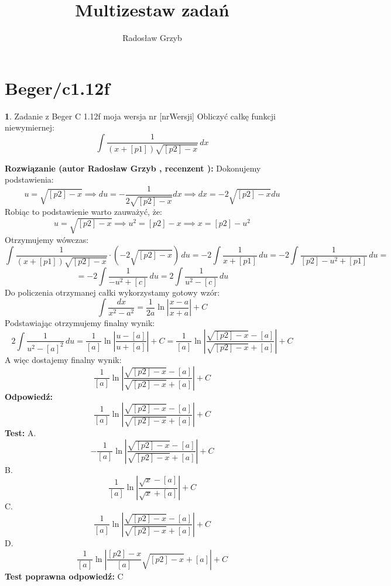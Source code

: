 \documentclass[12pt, a4paper]{article}
\title{Multizestaw zadań}
\author{Radosław Grzyb}
\date{}
\theoremstyle{definition} %
\newtheorem{zad}{}
\newcommand{\kategoria}[1]{\section{#1}} %
\newcommand{\zadStart}[1]{\begin{zad}#1\newline} %
\newcommand{\zadStop}{\end{zad}}   %
\newcommand{\rozwStart}[2]{\noindent \textbf{Rozwiązanie (autor #1 , recenzent #2): }\newline} %
\newcommand{\rozwStop}{\newline}                                            %
\newcommand{\odpStart}{\noindent \textbf{Odpowiedź:}\newline}    %
\newcommand{\odpStop}{\newline}                                             %
\newcommand{\testStart}{\noindent \textbf{Test:}\newline} %
\newcommand{\testStop}{\newline} %
\newcommand{\kluczStart}{\noindent \textbf{Test poprawna odpowiedź:}\newline} %
\newcommand{\kluczStop}{\newline} %
\begin{document}
\maketitle
\kategoria{Beger/c1.12f}
\zadStart{Zadanie z Beger C 1.12f moja wersja nr [nrWersji]}
Obliczyć całkę funkcji niewymiernej:
$$\int \frac{1}{(x+[p1])\sqrt{[p2]-x}}\,dx$$
\zadStop
\rozwStart{Radosław Grzyb}{}
Dokonujemy podstawienia:
$$u=\sqrt{[p2]-x}\implies du=-\frac{1}{2\sqrt{[p2]-x}}dx\implies dx=-2\sqrt{[p2]-x}du$$
Robiąc to podstawienie warto zauważyć, że:
$$u=\sqrt{[p2]-x}\implies u^2=[p2]-x \implies x=[p2]-u^2$$
Otrzymujemy wówczas:
$$\int \frac{1}{(x+[p1])\sqrt{[p2]-x}}\cdot(-2\sqrt{[p2]-x})\,du=-2\int \frac{1}{x+[p1]}\,du=-2\int \frac{1}{[p2]-u^2+[p1]}\,du=$$
$$=-2\int \frac{1}{-u^2+[c]}\,du=2\int \frac{1}{u^2-[c]}\,du$$
Do policzenia otrzymanej całki wykorzystamy gotowy wzór: $$\int\frac{dx}{x^2-a^2}=\frac{1}{2a}\ln\left|\frac{x-a}{x+a}\right|+C$$
Podstawiając otrzymujemy finalny wynik:
$$2\int \frac{1}{u^2-[a]^2}\,du=\frac{1}{[a]}\ln\left|\frac{u-[a]}{u+[a]}\right|+C=\frac{1}{[a]}\ln\left|\frac{\sqrt{[p2]-x}-[a]}{\sqrt{[p2]-x}+[a]}\right|+C$$
A więc dostajemy finalny wynik:
$$\frac{1}{[a]}\ln\left|\frac{\sqrt{[p2]-x}-[a]}{\sqrt{[p2]-x}+[a]}\right|+C$$
\rozwStop
\odpStart
$$\frac{1}{[a]}\ln\left|\frac{\sqrt{[p2]-x}-[a]}{\sqrt{[p2]-x}+[a]}\right|+C$$
\odpStop
\testStart
A.$$-\frac{1}{[a]}\ln\left|\frac{\sqrt{[p2]-x}-[a]}{\sqrt{[p2]-x}+[a]}\right|+C$$
B.$$\frac{1}{[a]}\ln\left|\frac{\sqrt{x}-[a]}{\sqrt{x}+[a]}\right|+C$$
C.$$\frac{1}{[a]}\ln\left|\frac{\sqrt{[p2]-x}-[a]}{\sqrt{[p2]-x}+[a]}\right|+C$$
D.$$\frac{1}{[a]}\ln\left|\frac{[p2]-x}{[a]}{\sqrt{[p2]-x}+[a]}\right|+C$$
\testStop
\kluczStart
C
\kluczStop
\end{document}
